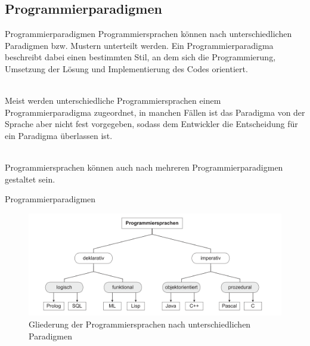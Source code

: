         \subsection{Programmierparadigmen}
        
            \begin{frame}{Programmierparadigmen}
                Programmiersprachen können nach unterschiedlichen Paradigmen bzw. Mustern unterteilt werden. Ein Programmierparadigma beschreibt dabei einen bestimmten Stil, an dem sich die Programmierung, Umsetzung der Lösung und Implementierung des Codes orientiert. \\~\
                
                Meist werden unterschiedliche Programmiersprachen einem Programmierparadigma zugeordnet, in manchen Fällen ist das Paradigma von der Sprache aber nicht fest vorgegeben, sodass dem Entwickler die Entscheidung für ein Paradigma überlassen ist. \\~\
                
                Programmiersprachen können auch nach mehreren Programmierparadigmen gestaltet sein.
                
            \end{frame}
            
            \begin{frame}{Programmierparadigmen}
                \begin{figure}
                    \centering
                    \includegraphics[width=\linewidth,height=0.5\textheight,keepaspectratio]{chapters/04_programming_languages/figures/paradigms/paradigms.png}
                    \caption{Gliederung der Programmiersprachen nach unterschiedlichen Paradigmen \cite{Muller2015}}
                \end{figure}   
            \end{frame}
            
